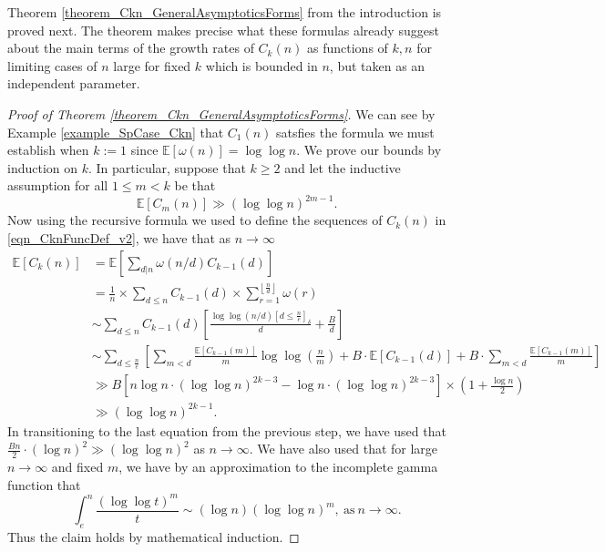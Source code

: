 \documentclass[11pt,reqno,a4letter]{article}
\numberwithin{figure}{section}
\numberwithin{table}{section}
\newcommand{\Iverson}[1]{\ensuremath{\left[#1\right]_{\delta}}}
\newcommand{\Floor}[2]{\ensuremath{\left\lfloor \frac{#1}{#2} \right\rfloor}}
\theoremstyle{plain}
\numberwithin{theorem}{section}
\theoremstyle{definition}
\newcommand{\NBRef}[1]{}
\begin{document}
Theorem \ref{theorem_Ckn_GeneralAsymptoticsForms} from the introduction is proved next. 
The theorem makes precise what these formulas already 
suggest about the main terms of the growth rates of 
$C_k(n)$ as functions of $k,n$ for limiting cases of $n$ large for fixed $k$ which is bounded in $n$, 
but taken as an independent parameter. 

\NBRef{A08-2020-04-26} 
\begin{proof}[Proof of Theorem \ref{theorem_Ckn_GeneralAsymptoticsForms}] 
\label{proofOf_theorem_Ckn_GeneralAsymptoticsForms} 
We can see by Example \ref{example_SpCase_Ckn} that $C_1(n)$ 
satsfies the formula we must establish when $k := 1$ since $\mathbb{E}[\omega(n)] = \log\log n$. 
We prove our bounds by induction on $k$. 
In particular, suppose that $k \geq 2$ and let the inductive assumption for all $1 \leq m < k$ 
be that 
\[
\mathbb{E}[C_m(n)] \gg (\log\log n)^{2m-1}. 
\] 
Now using the recursive formula we used to define the sequences of $C_k(n)$ in 
\eqref{eqn_CknFuncDef_v2}, we have that as $n \rightarrow \infty$ 
\begin{align*} 
\mathbb{E}[C_k(n)] & = \mathbb{E}\left[\sum_{d|n} \omega(n/d) C_{k-1}(d)\right] \\ 
     & = \frac{1}{n} \times \sum_{d \leq n} C_{k-1}(d) \times \sum_{r=1}^{\Floor{n}{d}} \omega(r) \\ 
     & \sim \sum_{d \leq n} C_{k-1}(d) \left[ 
     \frac{\log\log(n/d) \Iverson{d \leq \frac{n}{e}}}{d} + \frac{B}{d}\right] \\ 
     & \sim \sum_{d \leq \frac{n}{e}} \left[ 
     \sum_{m < d} \frac{\mathbb{E}[C_{k-1}(m)]}{m} \log\log\left(\frac{n}{m}\right) + 
     B \cdot \mathbb{E}[C_{k-1}(d)] + B \cdot \sum_{m < d} \frac{\mathbb{E}[C_{k-1}(m)]}{m} 
     \right] \\ 
     & \gg B \left[n \log n \cdot (\log\log n)^{2k-3} - \log n \cdot (\log\log n)^{2k-3}\right] \times 
     \left(1 + \frac{\log n}{2}\right) \\ 
     & \gg (\log\log n)^{2k-1}. 
\end{align*} 
In transitioning to the last equation from the previous step, we have used that 
$\frac{Bn}{2} \cdot (\log n)^2 \gg (\log\log n)^2$ as $n \rightarrow \infty$. We have also used that for large 
$n \rightarrow \infty$ and fixed $m$, we have by an approximation to the incomplete gamma function that 
\[
\int_{e}^{n} \frac{(\log\log t)^m}{t} \sim (\log n) (\log\log n)^{m}, 
     \mathrm{\ as\ } n \rightarrow \infty. 
\]
Thus the claim holds by mathematical induction. 
\end{proof} 
\end{document}
